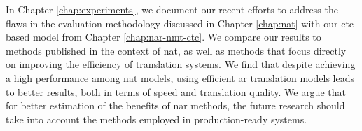 In Chapter \ref{chap:experiments}, we document our recent efforts to address
the flaws in the evaluation methodology discussed in Chapter \ref{chap:nat}
with our \acs{ctc}-based model from Chapter \ref{chap:nar-nmt-ctc}. We compare
our results to methods published in the context of \ac{nat}, as well as methods
that focus directly on improving the efficiency of translation systems.  We
find that despite achieving a high performance among \ac{nat} models, using
efficient \acl{ar} translation models leads to better results, both in terms of
speed and translation quality. We argue that for better estimation of the
benefits of \acl{nar} methods, the future research should take into account the
methods employed in production-ready systems.



